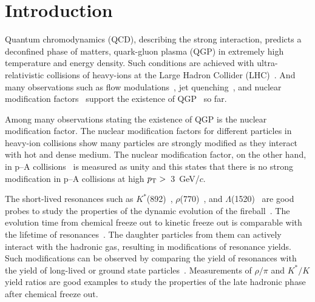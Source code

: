 
\section{Introduction}

Quantum chromodynamics (QCD), describing the strong interaction, predicts a deconfined phase of matters, quark-gluon plasma (QGP) in extremely high temperature and energy density. Such conditions are achieved with ultra-relativistic collisions of heavy-ions at the Large Hadron Collider (LHC)~\cite{Wolschin:2020qxa}. And many observations such as flow modulations~\cite{Bhalerao:2020ulk, ALICE:2019zfl}, jet quenching~\cite{ALICE:2019qyj}, and nuclear modification factors~\cite{ALICE:2019hno} support the existence of QGP~\cite{Adams:2005dq} so far.

Among many observations stating the existence of QGP is the nuclear modification factor. The nuclear modification factors for different particles in heavy-ion collisions show many particles are strongly modified as they interact with hot and dense medium. The nuclear modification factor, on the other hand, in p--A collisions~\cite{ALICE:2016dei} is measured as unity and this states that there is no strong modification in p--A collisions at high $p_{\rm{T}}>$~3~GeV/$c$.

The short-lived resonances such as $K^{*}$(892)~\cite{ALICE:2019etb, ALICE:2016sak}, $\rho$(770)~\cite{ALICE:2018qdv}, and $\Lambda$(1520)~\cite{ALICE:2018ewo} are good probes to study the properties of the dynamic evolution of the fireball~\cite{Bierlich:2021poz}. The evolution time from chemical freeze out to kinetic freeze out is comparable with the lifetime of resonances~\cite{ALICE:2011dyt, ALICE:2019xyr}. The daughter particles from them can actively interact with the hadronic gas, resulting in modifications of resonance yields. Such modifications can be observed by comparing the yield of resonances with the yield of long-lived or ground state particles~\cite{ALICE:2018pal}. Measurements of $\rho/\pi$ and $K^{*}/K$ yield ratios are good examples to study the properties of the late hadronic phase after chemical freeze out.

